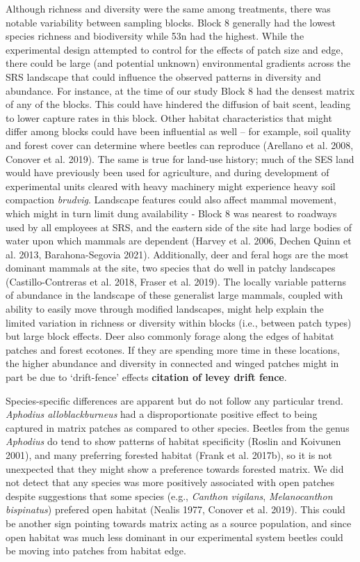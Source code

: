 \documentclass[
  man, donotrepeattitle]{apa6}
\begin{document}
Although richness and diversity were the same among treatments, there was notable variability between sampling blocks. Block 8 generally had the lowest species richness and biodiversity while 53n had the highest. While the experimental design attempted to control for the effects of patch size and edge, there could be large (and potential unknown) environmental gradients across the SRS landscape that could influence the observed patterns in diversity and abundance. For instance, at the time of our study Block 8 had the densest matrix of any of the blocks. This could have hindered the diffusion of bait scent, leading to lower capture rates in this block. Other habitat characteristics that might differ among blocks could have been influential as well -- for example, soil quality and forest cover can determine where beetles can reproduce (Arellano et al. 2008, Conover et al. 2019). The same is true for land-use history; much of the SES land would have previously been used for agriculture, and during development of experimental units cleared with heavy machinery might experience heavy soil compaction \emph{brudvig}. Landscape features could also affect mammal movement, which might in turn limit dung availability - Block 8 was nearest to roadways used by all employees at SRS, and the eastern side of the site had large bodies of water upon which mammals are dependent (Harvey et al. 2006, Dechen Quinn et al. 2013, Barahona-Segovia 2021). Additionally, deer and feral hogs are the most dominant mammals at the site, two species that do well in patchy landscapes (Castillo-Contreras et al. 2018, Fraser et al. 2019). The locally variable patterns of abundance in the landscape of these generalist large mammals, coupled with ability to easily move through modified landscapes, might help explain the limited variation in richness or diversity within blocks (i.e., between patch types) but large block effects. Deer also commonly forage along the edges of habitat patches and forest ecotones. If they are spending more time in these locations, the higher abundance and diversity in connected and winged patches might in part be due to `drift-fence' effects \textbf{citation of levey drift fence}.

Species-specific differences are apparent but do not follow any particular trend. \emph{Aphodius alloblackburneus} had a disproportionate positive effect to being captured in matrix patches as compared to other species. Beetles from the genus \emph{Aphodius} do tend to show patterns of habitat specificity (Roslin and Koivunen 2001), and many preferring forested habitat (Frank et al. 2017b), so it is not unexpected that they might show a preference towards forested matrix. We did not detect that any species was more positively associated with open patches despite suggestions that some species (e.g., \emph{Canthon vigilans}, \emph{Melanocanthon bispinatus}) prefered open habitat (Nealis 1977, Conover et al. 2019). This could be another sign pointing towards matrix acting as a source population, and since open habitat was much less dominant in our experimental system beetles could be moving into patches from habitat edge.
\end{document}
